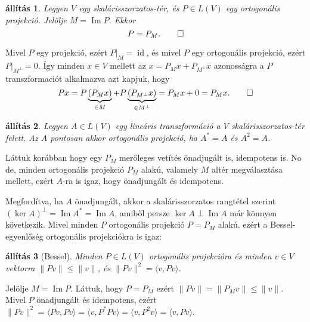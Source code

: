 \documentclass[a4paper, showtrims]{memoir}
\makeatletter
\renewenvironment{proof}[1][\proofname]
    {\par\pushQED{\qed}%
    \normalfont \topsep6\p@\@plus6\p@\relax
    \trivlist
    \item[\hskip\labelsep
        \itshape
    #1\@addpunct{:}]\ignorespaces}
    {\popQED\endtrivlist\@endpefalse}
\theoremstyle{plain}
\newtheorem{proposition}{állítás}[chapter]
\theoremstyle{remark}
\theoremstyle{definition}
\DeclareMathOperator{\id}{id}
\DeclareMathOperator{\im}{Im}
\newcommand{\ip}[2]{\langle#1,#2\rangle}
\makeatother
\begin{document}
\begin{proposition}
	Legyen $V$ egy skalárisszorzatos-tér,
	és $P\in L\left( V \right)$ egy ortogonális projekció.
	Jelölje $M=\im P$.
	Ekkor
	\[
		P=P_M.
		\qedhere
	\]
\end{proposition}
\begin{proof}
    Mivel $P$ egy projekció, ezért $P|_M=\id$, és mivel $P$ egy ortogonális projekció, 
    ezért $P|_{M^\perp}=0$.
    Így minden $x\in V$ mellett az $x=P_Mx+P_{M^\perp}x$ azonosságra a $P$ transzformaciót alkalmazva azt kapjuk, hogy
    \[
        Px
        =
        P\underbrace{\left( P_Mx \right)}_{\in M}+P\underbrace{\left( P_{M^\perp}x \right)}_{\in M^\perp}
        =
        P_Mx+0
        =
        P_Mx.
        \qedhere
    \]
\end{proof}
\begin{proposition}
	Legyen $A\in L\left( V \right)$ egy lineáris transzformáció a $V$ skalárisszorzatos-tér felett.
	Az $A$ pontosan akkor ortogonális projekció, ha $A^\ast=A$ és $A^2=A$.
\end{proposition}
\begin{proof}
	Láttuk korábban hogy egy $P_M$ merőleges vetítés önadjugált is, idempotens is.
	No de, minden ortogonális projekció $P_M$ alakú,
	valamely $M$ altér megválasztása mellett, ezért $A$-ra is igaz, hogy önadjungált és idempotens.

	Megfordítva, ha $A$ önadjungált, akkor a skalárisszorzatos rangtétel szerint $(\ker A)^\perp=\im A^\ast=\im A$,
	amiből persze $\ker A\perp\im A$ már könnyen következik.
\end{proof}
Mivel minden $P$ ortogonális projekció $P=P_M$ alakú,
ezért a Bessel-egyenlőség ortogonális projekciókra is igaz:
\begin{proposition}[Bessel]
	Minden  $P\in L\left( V \right)$ ortogonális projekcióra és minden $v\in V$ vektorra
	\(
	\|Pv\|\leq\|v\|
	\),
    és
    \(
    \|Pv\|^2=\ip{v}{Pv}
    \).
\end{proposition}
\begin{proof}
	Jelölje $M=\im P$.
    Láttuk, hogy $P=P_M$ ezért
	\(
	\|Pv\|
	=
	\|P_Mv\|
	\leq
	\|v\|.
	\)
    Mivel $P$ önadjungált és idempotens, 
    ezért
    \(
    \|Pv\|^2=\ip{Pv}{Pv}=\ip{v}{P^\ast Pv}=\ip{v}{P^2v}=\ip{v}{Pv}
    \).
\end{proof}
\end{document}
